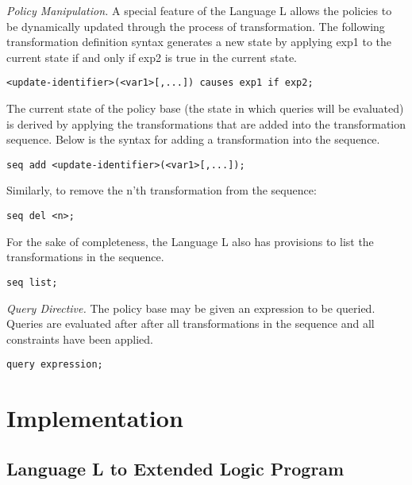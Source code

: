 \documentclass{llncs}
\begin{document}
      \emph{Policy Manipulation.} A special feature of the Language L allows
      the policies to be dynamically updated through the process of
      transformation. The following transformation definition syntax generates
      a new state by applying exp1 to the current state if and only if exp2 is
      true in the current state.

      \begin{verbatim}<update-identifier>(<var1>[,...]) causes exp1 if exp2;\end{verbatim}

      The current state of the policy base (the state in which queries will be
      evaluated) is derived by applying the transformations that are added into
      the transformation sequence. Below is the syntax for adding a
      transformation into the sequence.

      \begin{verbatim}seq add <update-identifier>(<var1>[,...]);\end{verbatim}

      Similarly, to remove the n'th transformation from the sequence:

      \begin{verbatim}seq del <n>;\end{verbatim}

      For the sake of completeness, the Language L also has provisions to list
      the transformations in the sequence.

      \begin{verbatim}seq list;\end{verbatim}

      \emph{Query Directive.} The policy base may be given an expression to be
      queried. Queries are evaluated after after all transformations in the
      sequence and all constraints have been applied.

      \begin{verbatim}query expression;\end{verbatim}

  \section{Implementation}

    \subsection{Language L to Extended Logic Program}
\end{document}
